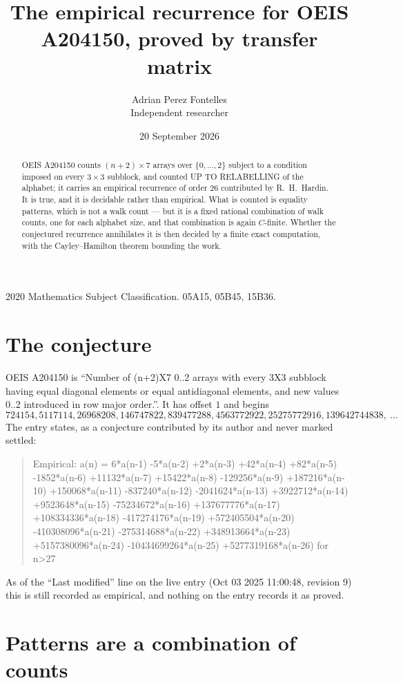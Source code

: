 \documentclass[11pt,a4paper]{article}
\title{The empirical recurrence for OEIS A204150, proved by transfer matrix}
\author{Adrian Perez Fontelles\\ \small Independent researcher}
\date{20 September 2026}
\theoremstyle{plain}
\theoremstyle{definition}
\begin{document}
\maketitle

\begin{abstract}
OEIS A204150 counts $(n+2)\times7$ arrays over $\{0,\dots,2\}$ subject to a condition imposed on
every $3\times3$ subblock, and counted UP TO RELABELLING of the
alphabet; it carries an empirical recurrence of order $26$ contributed by
R.~H.~Hardin. It is true, and it is decidable rather than empirical. What is counted is
equality patterns, which is not a walk count --- but it is a fixed rational combination of
walk counts, one for each alphabet size, and that combination is again $C$-finite. Whether the
conjectured recurrence annihilates it is then decided by a finite exact computation, with the
Cayley--Hamilton theorem bounding the work.
\end{abstract}

\noindent\small 2020 Mathematics Subject Classification. 05A15, 05B45, 15B36.\normalsize

\section{The conjecture}

OEIS A204150 is ``Number of (n+2)X7 0..2 arrays with every 3X3 subblock having equal diagonal elements or equal antidiagonal elements, and new values 0..2 introduced in row major order.''. It has offset $1$ and begins
\[
724154, 5117114, 26968208, 146747822, 839477288, 4563772922, 25275772916, 139642744838,\ \dots
\]
The entry states, as a conjecture contributed by its author and never marked settled:
\begin{quote}
Empirical: a(n) = 6*a(n-1) -5*a(n-2) +2*a(n-3) +42*a(n-4) +82*a(n-5) -1852*a(n-6) +11132*a(n-7) +15422*a(n-8) -129256*a(n-9) +187216*a(n-10) +150068*a(n-11) -837240*a(n-12) -2041624*a(n-13) +3922712*a(n-14) +9523648*a(n-15) -75234672*a(n-16) +137677776*a(n-17) +108334336*a(n-18) -417274176*a(n-19) +572405504*a(n-20) -410308096*a(n-21) -275314688*a(n-22) +348913664*a(n-23) +5157380096*a(n-24) -10434699264*a(n-25) +5277319168*a(n-26) for n>27
\end{quote}
As of the ``Last modified'' line on the live entry (Oct 03 2025 11:00:48, revision 9) this is still
recorded as empirical, and nothing on the entry records it as proved.

\section{Patterns are a combination of counts}
\end{document}
